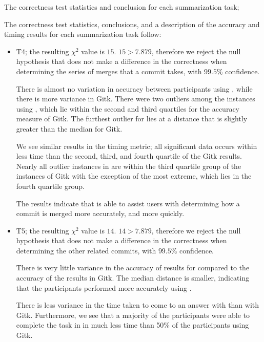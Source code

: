 \documentclass[draft]{IEEEtran}
\begin{document}
The correctness test statistics and conclusion for each summarization
task;

The correctness test statistics, conclusions, and a description of the
accuracy and timing results for each summarization task follow:

\begin{itemize}

  \item

    T4; the resulting $\chi^2$ value is $15$. $15 > 7.879$, therefore we
    reject the null hypothesis that \tool does not make a difference in
    the correctness when determining the series of merges that a commit
    takes, with $99.5\%$ confidence.

    There is almost no variation in accuracy between participants using
    \tool, while there is more variance in Gitk. There were two outliers
    among the instances using \tool, which lie within the second and
    third quartiles for the accuracy measure of Gitk. The furthest
    outlier for \tool lies at a distance that is slightly greater than
    the median for Gitk.

    We see similar results in the timing metric; all significant data
    occurs within less time than the second, third, and fourth quartile
    of the Gitk results. Nearly all outlier instances in \tool are
    within the third quartile group of the instances of Gitk with the
    exception of the most extreme, which lies in the fourth quartile
    group.

    The results indicate that \tool is able to assist users with
    determining how a commit is merged more accurately, and more
    quickly.

  \item

    T5; the resulting $\chi^2$ value is $14$. $14 > 7.879$, therefore we
    reject the null hypothesis that \tool does not make a difference in
    the correctness when determining the other related commits, with
    $99.5\%$ confidence.

    There is very little variance in the accuracy of results for \tool
    compared to the accuracy of the results in Gitk. The median distance
    is smaller, indicating that the participants performed more
    accurately using \tool.

    There is less variance in the time taken to come to an answer with
    \tool than with Gitk. Furthermore, we see that a majority of the
    participants were able to complete the task in \tool in much less
    time than 50\% of the participants using Gitk.


\end{itemize}
\end{document}
